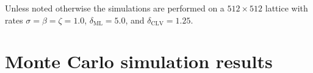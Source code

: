 \documentclass[12pt]{article}
\begin{document}
Unless noted otherwise the simulations are performed on a $ 512 \times 512 $ lattice with rates $ \sigma = \beta = \zeta =1.0 $, $ \delta_{\mathrm{ML}} = 5.0$, and $ \delta_{\mathrm{CLV}} = 1.25 $.


\section{Monte Carlo simulation results}%
\label{sec:monte_carlo_simulation_results}

\begin{figure}[!htb]
    \begin{center}
    \\

\end{center}
\end{figure}
\end{document}
